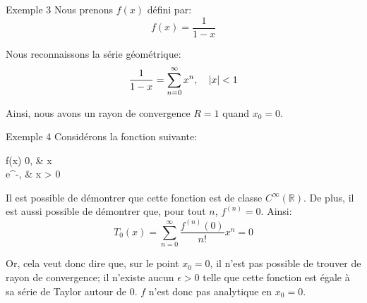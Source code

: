 \documentclass[a4paper]{article}
\begin{document}
\begin{parag}{Exemple 3}
    Nous prenons $f\left(x\right)$ défini par: 
    \[f\left(x\right) = \frac{1}{1-x}\]
    
    Nous reconnaissons la série géométrique: 
    \[\frac{1}{1-x} = \sum_{n=0}^{\infty} x^n, \mathspace \left|x\right| < 1\]

    Ainsi, nous avons un rayon de convergence $R = 1$ quand $x_0 = 0$.
\end{parag}

\begin{parag}{Exemple 4}
    Considérons la fonction suivante:
    \begin{functionbypart}{f\left(x\right)}
        0, &  x  \\
        e^{-}, &  x > 0
    \end{functionbypart}

    Il est possible de démontrer que cette fonction est de classe $C^\infty \left(\mathbb{R}\right)$. De plus, il est aussi possible de démontrer que, pour tout $n$, $f^{\left(n\right)} = 0$. Ainsi:
    \[T_0\left(x\right) = \sum_{n=0}^{\infty} \frac{f^{\left(n\right)}\left(0\right)}{n!} x^n = 0\]
    
    Or, cela veut donc dire que, sur le point $x_0 = 0$, il n'est pas possible de trouver de rayon de convergence; il n'existe aucun $\epsilon > 0$ telle que cette fonction est égale à sa série de Taylor autour de 0. $f$ n'est donc pas analytique en $x_0 = 0$.
\end{parag}
\end{document}
